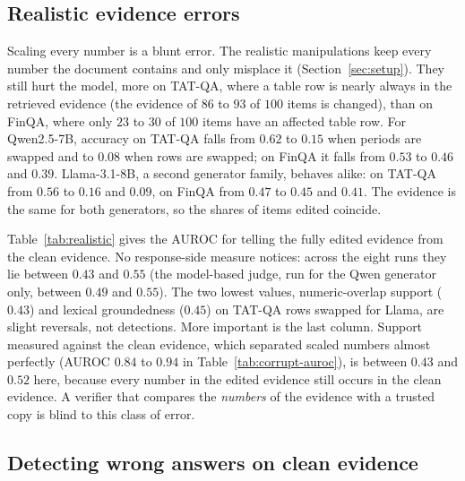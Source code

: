 \subsection{Realistic evidence errors}
\label{sec:res-realistic}

Scaling every number is a blunt error. The realistic manipulations keep every number the document contains and only misplace it (Section~\ref{sec:setup}).
They still hurt the model, more on TAT-QA, where a table row is nearly always in the retrieved evidence (the evidence of $86$ to $93$ of $100$ items is changed), than on FinQA, where only $23$ to $30$ of $100$ items have an affected table row.
For Qwen2.5-7B, accuracy on TAT-QA falls from $0.62$ to $0.15$ when periods are swapped and to $0.08$ when rows are swapped; on FinQA it falls from $0.53$ to $0.46$ and $0.39$. Llama-3.1-8B, a second generator family, behaves alike: on TAT-QA from $0.56$ to $0.16$ and $0.09$, on FinQA from $0.47$ to $0.45$ and $0.41$. The evidence is the same for both generators, so the shares of items edited coincide.

Table~\ref{tab:realistic} gives the AUROC for telling the fully edited evidence from the clean evidence. No response-side measure notices: across the eight runs they lie between $0.43$ and $0.55$ (the model-based judge, run for the Qwen generator only, between $0.49$ and $0.55$). The two lowest values, numeric-overlap support ($0.43$) and lexical groundedness ($0.45$) on TAT-QA rows swapped for Llama, are slight reversals, not detections.
More important is the last column. Support measured against the clean evidence, which separated scaled numbers almost perfectly (AUROC $0.84$ to $0.94$ in Table~\ref{tab:corrupt-auroc}), is between $0.43$ and $0.52$ here, because every number in the edited evidence still occurs in the clean evidence.
A verifier that compares the \emph{numbers} of the evidence with a trusted copy is blind to this class of error.

\begin{table}[t]
\centering\small
\resizebox{\textwidth}{!}{}
\caption{AUROC (95\% interval) for separating fully edited from clean evidence when table rows have their periods or values swapped (Qwen2.5-7B and Llama-3.1-8B, 100 items per row; the judge was run for the Qwen runs only). $^\dagger$ needs the gold answer. $^\ddagger$ needs the clean evidence; it compares numbers only.}
\label{tab:realistic}
\end{table}

\subsection{Detecting wrong answers on clean evidence}

